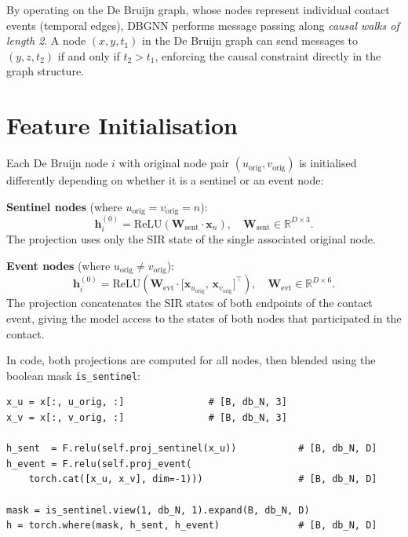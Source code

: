 \documentclass[12pt,a4paper]{report}
\newcommand{\R}{\mathbb{R}}
\newcommand{\bh}{\mathbf{h}}
\newcommand{\bx}{\mathbf{x}}
\newcommand{\bW}{\mathbf{W}}
\begin{document}
By operating on the De Bruijn graph, whose nodes represent individual contact
events (temporal edges), DBGNN performs message passing along \emph{causal walks
of length 2}. A node $(x,y,t_1)$ in the De Bruijn graph can send messages to
$(y,z,t_2)$ if and only if $t_2 > t_1$, enforcing the causal constraint
directly in the graph structure.

\section{Feature Initialisation}

Each De Bruijn node $i$ with original node pair $(u_{\text{orig}},
v_{\text{orig}})$ is initialised differently depending on whether it is a
sentinel or an event node:

\textbf{Sentinel nodes} (where $u_{\text{orig}} = v_{\text{orig}} = n$):
\begin{equation}
  \bh_i^{(0)} = \text{ReLU}\!\left(\bW_{\text{sent}} \cdot \bx_{n}\right), \quad \bW_{\text{sent}} \in \R^{D \times 3}.
  \label{eq:db_init_sent}
\end{equation}
The projection uses only the SIR state of the single associated original node.

\textbf{Event nodes} (where $u_{\text{orig}} \neq v_{\text{orig}}$):
\begin{equation}
  \bh_i^{(0)} = \text{ReLU}\!\left(\bW_{\text{evt}} \cdot \bigl[\bx_{u_{\text{orig}}},\, \bx_{v_{\text{orig}}}\bigr]^\top\right), \quad \bW_{\text{evt}} \in \R^{D \times 6}.
  \label{eq:db_init_evt}
\end{equation}
The projection concatenates the SIR states of both endpoints of the contact
event, giving the model access to the states of both nodes that participated
in the contact.

In code, both projections are computed for all nodes, then blended using the
boolean mask \texttt{is\_sentinel}:
\begin{lstlisting}[caption={DBGNN feature initialisation.}]
x_u = x[:, u_orig, :]               # [B, db_N, 3]
x_v = x[:, v_orig, :]               # [B, db_N, 3]

h_sent  = F.relu(self.proj_sentinel(x_u))           # [B, db_N, D]
h_event = F.relu(self.proj_event(
    torch.cat([x_u, x_v], dim=-1)))                 # [B, db_N, D]

mask = is_sentinel.view(1, db_N, 1).expand(B, db_N, D)
h = torch.where(mask, h_sent, h_event)              # [B, db_N, D]
\end{lstlisting}
\end{document}
